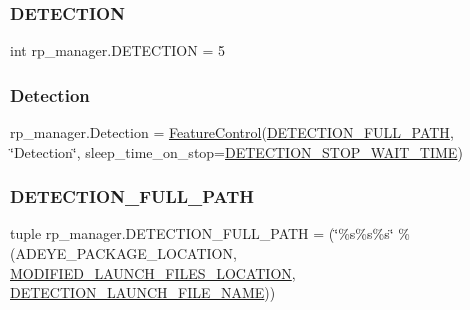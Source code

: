 \mbox{\label{namespacerp__manager_ac227be112745c88525a9667580cec00b}} 
\subsubsection{\texorpdfstring{D\+E\+T\+E\+C\+T\+I\+ON}{DETECTION}}
{\footnotesize\ttfamily int rp\+\_\+manager.\+D\+E\+T\+E\+C\+T\+I\+ON = 5}

\mbox{\label{namespacerp__manager_a48713c04a94d14edf4a48051376c73ca}} 
\subsubsection{\texorpdfstring{Detection}{Detection}}
{\footnotesize\ttfamily rp\+\_\+manager.\+Detection = \hyperlink{classFeatureControl_1_1FeatureControl}{Feature\+Control}(\hyperlink{namespacerp__manager_a70fad5203ba45cd0085ee33158b164be}{D\+E\+T\+E\+C\+T\+I\+O\+N\+\_\+\+F\+U\+L\+L\+\_\+\+P\+A\+TH}, \char`\"{}Detection\char`\"{}, sleep\+\_\+time\+\_\+on\+\_\+stop=\hyperlink{namespacerp__manager_a2a1de6661f1541719bab9d3d2e7661a1}{D\+E\+T\+E\+C\+T\+I\+O\+N\+\_\+\+S\+T\+O\+P\+\_\+\+W\+A\+I\+T\+\_\+\+T\+I\+ME})}

\mbox{\label{namespacerp__manager_a70fad5203ba45cd0085ee33158b164be}} 
\subsubsection{\texorpdfstring{D\+E\+T\+E\+C\+T\+I\+O\+N\+\_\+\+F\+U\+L\+L\+\_\+\+P\+A\+TH}{DETECTION\_FULL\_PATH}}
{\footnotesize\ttfamily tuple rp\+\_\+manager.\+D\+E\+T\+E\+C\+T\+I\+O\+N\+\_\+\+F\+U\+L\+L\+\_\+\+P\+A\+TH = (\char`\"{}\%s\%s\%s\char`\"{} \% (A\+D\+E\+Y\+E\+\_\+\+P\+A\+C\+K\+A\+G\+E\+\_\+\+L\+O\+C\+A\+T\+I\+ON, \hyperlink{namespacerp__manager_a43208312336e22fa0f9a976a69e1519e}{M\+O\+D\+I\+F\+I\+E\+D\+\_\+\+L\+A\+U\+N\+C\+H\+\_\+\+F\+I\+L\+E\+S\+\_\+\+L\+O\+C\+A\+T\+I\+ON}, \hyperlink{namespacerp__manager_abf958196458f1890b8b9077998975e2e}{D\+E\+T\+E\+C\+T\+I\+O\+N\+\_\+\+L\+A\+U\+N\+C\+H\+\_\+\+F\+I\+L\+E\+\_\+\+N\+A\+ME}))}

